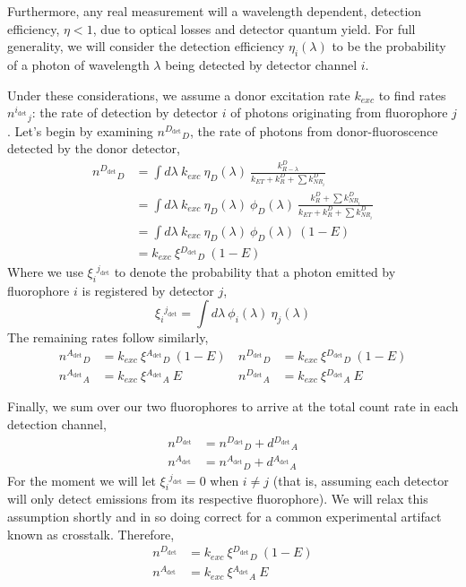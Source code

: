 \documentclass{article}
\newcommand{\dt}[1]{\ensuremath{^{#1_\mathrm{det}}}}   %
\newcommand{\NR}{\ensuremath{\mathit{NR}}}          %
\newcommand{\ET}{\ensuremath{\mathit{ET}}}          %
\begin{document}
Furthermore, any real measurement will a wavelength dependent,
detection efficiency, $\eta < 1$, due to optical losses and detector
quantum yield. For full generality, we will consider the detection
efficiency $\eta_i(\lambda)$ to be the probability of a photon of
wavelength $\lambda$ being detected by detector channel $i$.

Under these considerations, we assume a donor excitation rate
$k_{exc}$ to find rates $n\dt{i}_j$: the rate of detection by
detector $i$ of photons originating from fluorophore $j$. Let's begin
by examining $n\dt{D}_D$, the rate of photons from donor-fluoroscence
detected by the donor detector,
\begin{align*}
  n\dt{D}_D
  & = \int d\lambda ~ k_{exc} ~ \eta_D(\lambda) ~ \frac{k^D_{R-\lambda}}{k_\ET + k^D_R + \sum k^D_{\NR_i}} \\
  & = \int d\lambda ~ k_{exc} ~ \eta_D(\lambda) ~ \phi_D(\lambda) ~
         \frac{k^D_R + \sum k^D_{\NR_i}}{k_\ET + k^D_R + \sum k^D_{\NR_i}} \\
  & = \int d\lambda ~ k_{exc} ~ \eta_D(\lambda) ~ \phi_D(\lambda) ~ (1 - E) \\
  & = k_{exc} ~ \xi\dt{D}_D ~ (1 - E)
\end{align*}
Where we use $\xi_i\dt{j}$ to denote the probability that a photon
emitted by fluorophore $i$ is registered by detector $j$,
\[ \xi_i\dt{j} = \int d\lambda ~ \phi_i(\lambda) ~ \eta_j(\lambda) \]
%
The remaining rates follow similarly,
\begin{align*}
  n\dt{A}_D & = k_{exc} ~ \xi\dt{A}_D ~ (1 - E) \, &
  n\dt{D}_D & = k_{exc} ~ \xi\dt{D}_D ~ (1 - E) \\
  n\dt{A}_A & = k_{exc} ~ \xi\dt{A}_A ~ E \, &
  n\dt{D}_A & = k_{exc} ~ \xi\dt{D}_A ~ E
\end{align*}

Finally, we sum over our two fluorophores to arrive at the total count
rate in each detection channel,
\begin{align*}
  n\dt{D} & = n\dt{D}_D + d\dt{D}_A \\
  n\dt{A} & = n\dt{A}_D + d\dt{A}_A
\end{align*}
For the moment we will let $\xi_i\dt{j} = 0$ when $i \ne j$ (that is,
assuming each detector will only detect emissions from its respective
fluorophore). We will relax this assumption shortly and in so doing
correct for a common experimental artifact known as crosstalk. Therefore,
\begin{align*}
  n\dt{D} & = k_{exc} ~ \xi\dt{D}_D ~ (1 - E) \\
  n\dt{A} & = k_{exc} ~ \xi\dt{A}_A ~ E
\end{align*}
\end{document}

